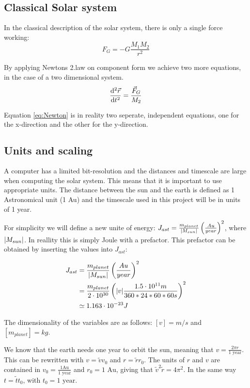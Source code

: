 
\subsection{Classical Solar system}
In the classical description of the solar system, there is only a single force working:
\begin{equation}
 F_G = - G\frac{M_{1}M_2}{r ^2} \label{eq:F_G}
\end{equation}

By applying Newtons 2.law on component form we achieve two more equations, in the case of a two dimensional system. 
\begin{equation}
\dv[2]{\vec{r	}}{t} = \frac{\vec{F}_G}{M_2} \label{eq:Newton}
\end{equation}

Equation \ref{eq:Newton} is in reality two seperate, independent equations, one for the x-direction and the other for the y-direction. 
 
 
  
\subsection{Units and scaling}

A computer has a limited bit-resolution and the distances and timescale are large when computing the solar system. This means that it is important to use appropriate units. The distance between the sun and the earth is defined as 1 Astronomical unit (1 Au) and the timescale used in this project will be in units of 1 year. 


For simplicity we will define a new unite of energy: $ J_{ast}  = \frac{m_{planet}}{\abs{M_{sun}}} \left(\frac{Au}{year}\right)^2$, where $ \abs{M_{sun}} $. In reallity this is simply Joule with a prefactor. This prefactor can be obtained by inserting the values into $ J_{ast} $:
	
	\begin{align}
J_{ast}  &= \frac{m_{planet}}{\abs{M_{sun}}}\left(\frac{Au}{year}\right)^2\\
&= \frac{m_{planet}}{2\cdot 10^{30}}	\left(\abs{v}	\frac{1.5 \cdot 10^{11}m}{360*24*60*60 s}\right)^2\\
&\simeq 1.163\cdot 10^{-23} J
\end{align}

The dimensionality of the variables are as follows:  $ [v] = m/s $ and $ [m_{planet}] = kg $.
	



We know that the earth needs one year to orbit the sun, meaning that $ v = \frac{2\pi r}{\text{1 year}} $. This can be rewritten with $ v = \tilde{v}v_0 $ and $ r = \tilde{r}r_0 $. The units of $ r $ and $ v $ are contained in  $ v_0 = \frac{1 \text{Au}}{1 \text{ year}} $ and $ r_0=1\text{ Au} $, giving that $ \tilde{v}^2\tilde{r} = 4\pi^2 $. In the same way $ t = \tilde{t}t_0 $, with $ t_0 = 1 \text{ year} $. 


